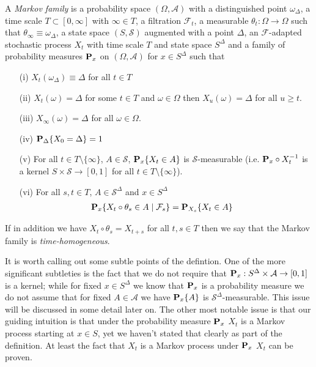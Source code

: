 \begin{defn}\label{HomogeneousMarkovFamilyBlumenthalGetoor}
A \emph{Markov family} is a
probability space $(\Omega, \mathcal{A})$ with a distinguished point $\omega_\Delta$, a time scale $T
\subset [0,\infty]$ with $\infty \in T$, a filtration $\mathcal{F}_t$, a measurable $\theta_t : \Omega \to \Omega$ such that $\theta_\infty \equiv \omega_\Delta$, a state space $(S, \mathcal{S})$ augmented with a point $\Delta$, an $\mathcal{F}$-adapted stochastic process $X_t$ with time scale $T$ and state space $S^\Delta$ and a family of
probability measures $\probabilityop_x$ on $(\Omega, \mathcal{A})$ for $x \in S^\Delta$ such that 
\begin{itemize}
\item[(i)] $X_t(\omega_\Delta) \equiv \Delta$ for all $t \in T$
\item[(ii)] $X_t(\omega) = \Delta$ for some $t \in T$ and $\omega \in \Omega$ then $X_u(\omega) = \Delta$ for all $u \geq t$.
\item[(iii)] $X_\infty(\omega) = \Delta$ for all $\omega \in \Omega$.
\item[(iv)] $\sprobability{X_0 = \Delta}{\Delta} = 1$
\item[(v)] For all $t \in T \setminus \lbrace \infty \rbrace$, $A \in \mathcal{S}$, $\sprobability{X_t \in A}{x}$ is $\mathcal{S}$-measurable (i.e. $\pushforward{X_t}{\probabilityop_x}$ is a kernel $S \times \mathcal{S} \to [0,1]$ for all $t \in T \setminus \lbrace \infty \rbrace$).
\item[(vi)] For all $s,t \in T$, $A \in \mathcal{S}^\Delta$ and $x \in S^\Delta$
\begin{align*}
\csprobability{\mathcal{F}_s}{X_{t} \circ \theta_s \in A}{x}&= \sprobability{X_t \in A}{X_s}
\end{align*}
\end{itemize}
If in addition we have $X_t \circ \theta_s = X_{t+s}$ for all $t,s \in T$ then we say that the Markov family is \emph{time-homogeneous}.
\end{defn}

It is worth calling out some subtle points of the defintion.  One of the more significant subtleties is the fact that we do not require that $\probabilityop_x : S^\Delta \times \mathcal{A} \to [0,1]$ is a kernel; while for fixed $x \in S^\Delta$ we know that $\probabilityop_x$ is a probability measure we do not assume that for fixed $A \in \mathcal{A}$ we have $\sprobability{A}{x}$ is $\mathcal{S}^\Delta$-measurable.  This issue will be discussed in some detail later on.  The other most notable issue is that our guiding intuition is that under the probability measure $\probabilityop_x$ $X_t$ is a Markov process starting at $x \in S$, yet we haven't stated that clearly as part of the definition.  At least the fact that $X_t$ is a Markov process under $\probabilityop_x$ $X_t$ can be proven.

